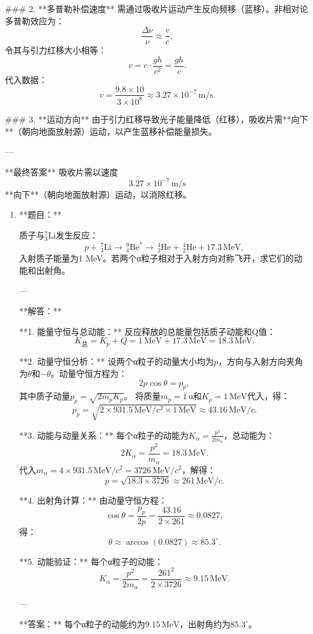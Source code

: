 \documentclass{article}
\begin{document}
\begin{enumerate}
### 2. **多普勒补偿速度**
需通过吸收片运动产生反向频移（蓝移）。非相对论多普勒效应为：
\[
\frac{\Delta \nu}{\nu} \approx \frac{v}{c},
\]
令其与引力红移大小相等：
\[
v = c \cdot \frac{gh}{c^2} = \frac{gh}{c}.
\]
代入数据：
\[
v = \frac{9.8 \times 10}{3 \times 10^8} \approx 3.27 \times 10^{-7} \, \text{m/s}.
\]

### 3. **运动方向**
由于引力红移导致光子能量降低（红移），吸收片需**向下**（朝向地面放射源）运动，以产生蓝移补偿能量损失。

---

**最终答案**  
吸收片需以速度  
\[
\boxed{3.27 \times 10^{-7} \, \text{m/s}}
\]  
**向下**（朝向地面放射源）运动，以消除红移。
\end{enumerate}

\begin{enumerate}
    \item **题目：**

质子与\(^7_3\text{Li}\)发生反应：  
\[
p + \, ^7_3\text{Li} \rightarrow \, ^9_4\text{Be}^* \rightarrow \, ^4_2\text{He} + \, ^4_2\text{He} + 17.3\,\text{MeV},
\]  
入射质子能量为1 MeV。若两个α粒子相对于入射方向对称飞开，求它们的动能和出射角。

---

**解答：**

**1. 能量守恒与总动能：**  
反应释放的总能量包括质子动能和Q值：  
\[
K_{\text{总}} = K_p + Q = 1\,\text{MeV} + 17.3\,\text{MeV} = 18.3\,\text{MeV}.
\]

**2. 动量守恒分析：**  
设两个α粒子的动量大小均为\(p\)，方向与入射方向夹角为\(\theta\)和\(-\theta\)。动量守恒方程为：  
\[
2p \cos\theta = p_p,
\]  
其中质子动量\(p_p = \sqrt{2 m_p K_p}\)。  
将质量\(m_p = 1\,\text{u}\)和\(K_p = 1\,\text{MeV}\)代入，得：  
\[
p_p = \sqrt{2 \times 931.5\,\text{MeV}/c^2 \times 1\,\text{MeV}} \approx 43.16\,\text{MeV}/c.
\]

**3. 动能与动量关系：**  
每个α粒子的动能为\(K_\alpha = \frac{p^2}{2m_\alpha}\)，总动能为：  
\[
2K_\alpha = \frac{p^2}{m_\alpha} = 18.3\,\text{MeV}.
\]  
代入\(m_\alpha = 4 \times 931.5\,\text{MeV}/c^2 = 3726\,\text{MeV}/c^2\)，解得：  
\[
p = \sqrt{18.3 \times 3726} \approx 261\,\text{MeV}/c.
\]

**4. 出射角计算：**  
由动量守恒方程：  
\[
\cos\theta = \frac{p_p}{2p} = \frac{43.16}{2 \times 261} \approx 0.0827,
\]  
得：  
\[
\theta \approx \arccos(0.0827) \approx 85.3^\circ.
\]

**5. 动能验证：**  
每个α粒子的动能：  
\[
K_\alpha = \frac{p^2}{2m_\alpha} = \frac{261^2}{2 \times 3726} \approx 9.15\,\text{MeV}.
\]

---

**答案：**  
每个α粒子的动能约为\(\boxed{9.15\,\text{MeV}}\)，出射角约为\(\boxed{85.3^\circ}\)。
\end{enumerate}
\end{document}
